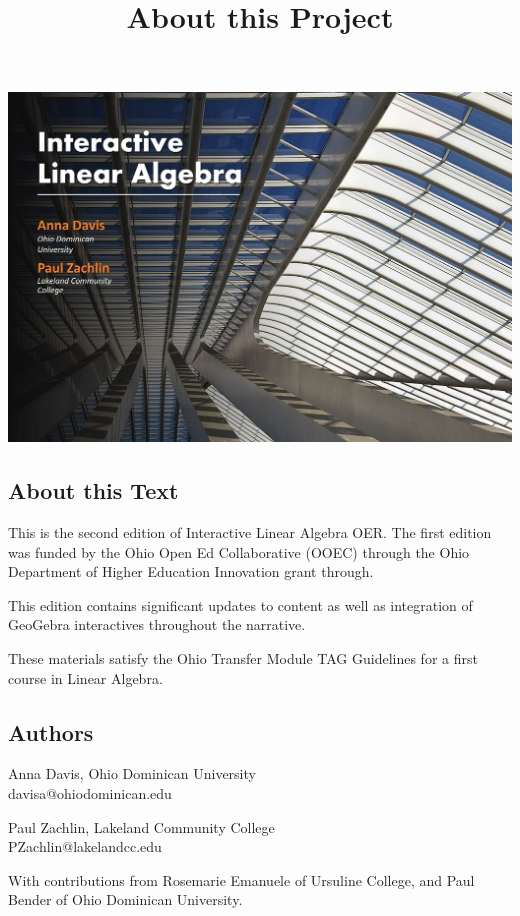 \documentclass{ximera}
\title{About this Project} \license{CC-BY 4.0}
\begin{document}
\begin{abstract}
\end{abstract}
\maketitle

\begin{image}
\includegraphics{BookCover.jpg}
\end{image}

\subsection{About this Text}
This is the second edition of Interactive Linear Algebra OER.  The first edition was funded by the Ohio Open Ed Collaborative (OOEC) through the Ohio Department of Higher Education Innovation grant through. 

This edition contains significant updates to content as well as integration of GeoGebra interactives throughout the narrative.

These materials satisfy the Ohio Transfer Module TAG Guidelines for a first course in Linear Algebra.  

\subsection{Authors}
Anna Davis, Ohio Dominican University\\
davisa@ohiodominican.edu

Paul Zachlin, Lakeland Community College\\
PZachlin@lakelandcc.edu

With contributions from Rosemarie Emanuele of Ursuline College, and Paul Bender of Ohio Dominican University.
\end{document}

